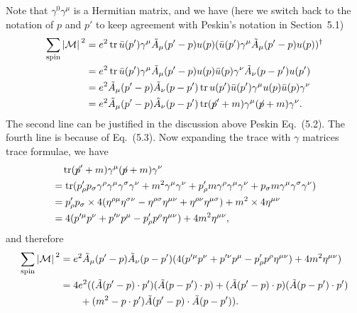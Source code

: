 \documentclass[hyperref, a4paper]{article}
\newcommand{\fsl}[1]{{\centernot{#1}}}
\begin{document}
\begin{itemize}
Note that $\gamma^0 \gamma^\mu$ is a Hermitian matrix, and we have (here we switch back to the notation 
of $p$ and $p'$ to keep agreement with Peskin's notation in Section~5.1) 
\[
    \begin{aligned}
        \sum_\text{spin} \abs*{\mathcal{M}}^2 &= e^2 \trace \bar{u}(p') \gamma^\mu \tilde{A}_\mu(p' - p) u(p) (\bar{u}(p') \gamma^\mu \tilde{A}_\mu(p' - p) u(p) )^\dagger \\
        &= e^2 \trace \bar{u}(p') \gamma^\mu \tilde{A}_\mu(p' - p) u(p) \bar{u}(p) \gamma^\nu \tilde{A}_\nu(p - p') u(p') \\
        &= e^2 \tilde{A}_\mu(p' - p) \tilde{A}_\nu(p - p') \trace u(p') \bar{u}(p') \gamma^\mu u(p) \bar{u}(p) \gamma^\nu \\
        &= e^2 \tilde{A}_\mu(p' - p) \tilde{A}_\nu(p - p') \trace (\fsl{p}' + m) \gamma^\mu (\fsl{p} + m) \gamma^\nu .
    \end{aligned}
\]
The second line can be justified in the discussion above Peskin Eq.~(5.2). The fourth line is because of Eq.~(5.3).
Now expanding the trace with $\gamma$ matrices trace formulae, we have 
\[
    \begin{aligned}
        &\quad \trace (\fsl{p}' + m) \gamma^\mu (\fsl{p} + m) \gamma^\nu \\
        &= \trace (p'_\rho p_\sigma \gamma^\rho \gamma^\mu \gamma^\sigma \gamma^\nu + m^2 \gamma^\mu \gamma^\nu + p'_\rho m \gamma^\rho \gamma^\mu \gamma^\nu + p_\sigma m \gamma^\mu \gamma^\sigma \gamma^\nu ) \\
        &= p'_\rho p_\sigma \times 4 (\eta^{\rho \mu} \eta^{\sigma \nu} - \eta^{\rho \sigma} \eta^{\mu \nu} + \eta^{\rho \nu} \eta^{\mu \sigma}) + m^2 \times 4 \eta^{\mu \nu} \\
        &= 4 (p'^\mu p^\nu + p'^\nu p^\mu - p'_\rho p^\rho \eta^{\mu \nu}) + 4 m^2 \eta^{\mu \nu},
    \end{aligned}
\]
and therefore 
\begin{equation}
    \begin{aligned}
        \sum_\text{spin} \abs*{\mathcal{M}}^2 &= e^2 \tilde{A}_\mu(p' - p) \tilde{A}_\nu(p - p') (4 (p'^\mu p^\nu + p'^\nu p^\mu - p'_\rho p^\rho \eta^{\mu \nu}) + 4 m^2 \eta^{\mu \nu}) \\
        &= 4 e^2 ( (\tilde{A}(p'-p) \cdot p') (\tilde{A}(p - p') \cdot p) + (\tilde{A}(p'-p) \cdot p) (\tilde{A}(p - p') \cdot p') \\
        &\quad \quad + (m^2 - p \cdot p') \tilde{A}(p'-p) \cdot \tilde{A}(p - p') ) .
    \end{aligned}
    \label{eq:general-m-2}
\end{equation}


\end{itemize}
\end{document}
